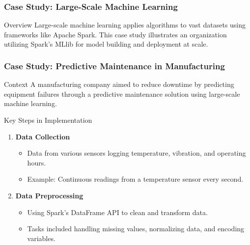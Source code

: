 \documentclass[aspectratio=169]{beamer}
\begin{document}
\begin{frame}
    \frametitle{Case Study: Large-Scale Machine Learning}
    \begin{block}{Overview}
        Large-scale machine learning applies algorithms to vast datasets using frameworks like Apache Spark. This case study illustrates an organization utilizing Spark's MLlib for model building and deployment at scale.
    \end{block}
\end{frame}

\begin{frame}[fragile]
    \frametitle{Case Study: Predictive Maintenance in Manufacturing}
    \begin{block}{Context}
        A manufacturing company aimed to reduce downtime by predicting equipment failures through a predictive maintenance solution using large-scale machine learning.
    \end{block}

    \begin{block}{Key Steps in Implementation}
        \begin{enumerate}
            \item \textbf{Data Collection}
                \begin{itemize}
                    \item Data from various sensors logging temperature, vibration, and operating hours.
                    \item Example: Continuous readings from a temperature sensor every second.
                \end{itemize}
            \item \textbf{Data Preprocessing}
                \begin{itemize}
                    \item Using Spark's DataFrame API to clean and transform data.
                    \item Tasks included handling missing values, normalizing data, and encoding variables.
                \end{itemize}
        \end{enumerate}
    \end{block}
\end{frame}
\end{document}
